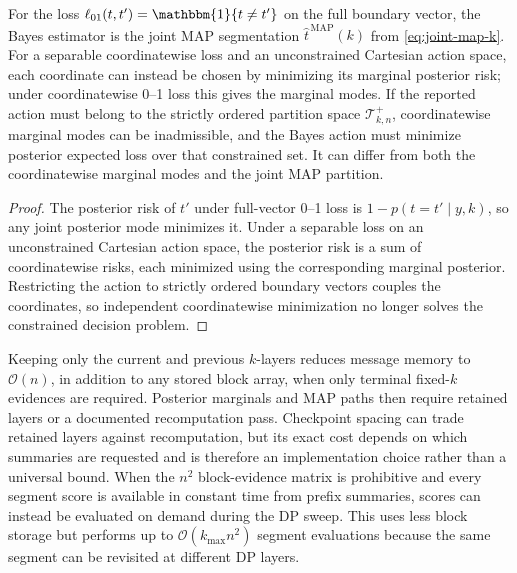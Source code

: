 \begin{corollary}
\label{cor:map-01}
For the loss $\ell_{01}(t,t')=\mathbbm{1}\{t\neq t'\}$ on the full boundary vector, the Bayes
estimator is the joint MAP segmentation $\widehat{t}^{\,\mathrm{MAP}}(k)$ from
\eqref{eq:joint-map-k}. For a separable coordinatewise loss and an unconstrained Cartesian action
space, each coordinate can instead be chosen by minimizing its marginal posterior risk; under
coordinatewise 0--1 loss this gives the marginal modes. If the reported action must belong to the
strictly ordered partition space $\mathcal T^+_{k,n}$, coordinatewise marginal modes can be
inadmissible, and the Bayes action must minimize posterior expected loss over that constrained set.
It can differ from both the coordinatewise marginal modes and the joint MAP partition.
\end{corollary}

\begin{proof}
The posterior risk of $t'$ under full-vector 0--1 loss is $1-p(t=t'\mid y,k)$, so any joint
posterior mode minimizes it. Under a separable loss on an unconstrained Cartesian action space, the
posterior risk is a sum of coordinatewise risks, each minimized using the corresponding marginal
posterior. Restricting the action to strictly ordered boundary vectors couples the coordinates, so
independent coordinatewise minimization no longer solves the constrained decision problem.
\end{proof}

\begin{remark}
\label{rem:mem-time}
Keeping only the current and previous $k$-layers reduces message memory to $\mathcal{O}(n)$, in
addition to any stored block array, when only terminal fixed-$k$ evidences are required. Posterior
marginals and MAP paths then require retained layers or a documented recomputation pass. Checkpoint
spacing can trade retained layers against recomputation, but its exact cost depends on which
summaries are requested and is therefore an implementation choice rather than a universal bound.
When the $n^2$ block-evidence matrix is prohibitive and every segment score is available in constant
time from prefix summaries, scores can instead be evaluated on demand during the DP sweep. This
uses less block storage but performs up to $\mathcal{O}(k_{\max}n^2)$ segment evaluations because
the same segment can be revisited at different DP layers.
\end{remark}

